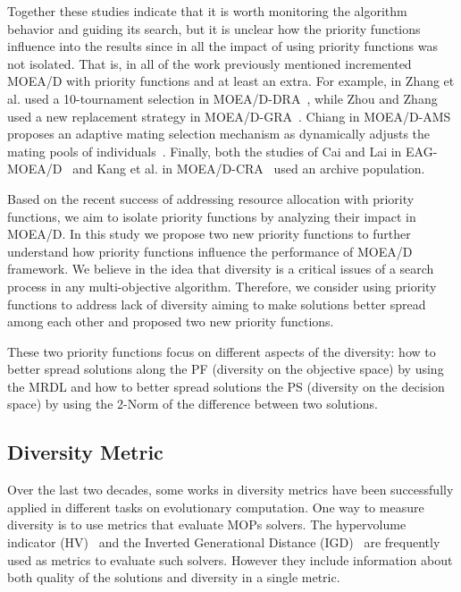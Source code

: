 Together these studies indicate that it is worth monitoring the algorithm behavior and guiding its search, but it is unclear how the priority functions influence into the results since in all the impact of using priority functions was not isolated. That is, in all of the work previously mentioned incremented MOEA/D with priority functions and at least an extra. For example, in Zhang et al. used a 10-tournament selection in MOEA/D-DRA~\cite{zhang2009performance}, while Zhou and Zhang used a new replacement strategy in MOEA/D-GRA~\cite{zhou2016all}. Chiang in MOEA/D-AMS proposes an adaptive mating selection mechanism as dynamically adjusts the mating pools of individuals~\cite{chiang2011moea}. Finally, both the studies of Cai and Lai in  EAG-MOEA/D~\cite{cai2015external} and Kang et al. in MOEA/D-CRA~\cite{kang2018collaborative} used an archive population.

Based on the recent success of addressing resource allocation with priority functions, we aim to isolate priority functions by analyzing their impact in MOEA/D. In this study we propose two new priority functions to further understand how priority functions influence the performance of MOEA/D framework. We believe in the idea that diversity is a critical issues of a search process in any multi-objective algorithm. Therefore, we consider using priority functions to address lack of diversity aiming to make solutions better spread among each other and proposed two new priority functions. 

These two priority functions focus on different aspects of the diversity:  how to better spread solutions along the PF (diversity on the objective space) by using the MRDL and how to better spread solutions the PS (diversity on the decision space) by using the 2-Norm of the difference between two solutions.



\subsection{Diversity Metric}


Over the last two decades, some works in diversity metrics have been successfully applied in different tasks on evolutionary computation. One way to measure diversity is to use metrics that evaluate MOPs solvers. The hypervolume indicator (HV)~\cite{zitzler1998multiobjective} and the Inverted Generational Distance (IGD)~\cite{zhang2008rm} are frequently used as metrics to evaluate such solvers. However they include information about both quality of the solutions and diversity in a single metric.

